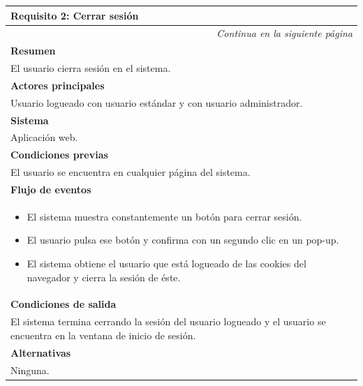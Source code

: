 \begin{longtable}{|p{}|}
\hline
\rowcolor[gray]{.5}
 \color{white}\textbf{Requisito 2: Cerrar sesión} \\
\hline
\endfirsthead
\endhead
\hline \multicolumn{1}{r}{\textit{Continua en la siguiente página}} \\
\endfoot
\endlastfoot
    \rowcolor[gray]{.9}
     \textbf{Resumen} \\
     \hline
     El usuario cierra sesión en el sistema. \\
     \hline
     \rowcolor[gray]{.9}
     \textbf{Actores principales} \\
     \hline
     Usuario logueado con usuario estándar y con usuario administrador. \\
     \hline
     \rowcolor[gray]{.9}
     \textbf{Sistema} \\
     \hline
     Aplicación web. \\
     \hline
     \rowcolor[gray]{.9}
     \textbf{Condiciones previas} \\
     \hline
      El usuario se encuentra en cualquier página del sistema.\\
     \hline
     \rowcolor[gray]{.9}
     \textbf{Flujo de eventos} \\
     \hline
      \begin{itemize}
         \item El sistema muestra constantemente un botón para cerrar sesión.
         \item El usuario pulsa ese botón y confirma con un segundo clic en un pop-up.
         \item El sistema obtiene el usuario que está logueado de las cookies del navegador y cierra la sesión de éste.
     \end{itemize} \\
     \hline
     \rowcolor[gray]{.9}
     \textbf{Condiciones de salida} \\
     \hline
     El sistema termina cerrando la sesión del usuario logueado y el usuario se encuentra en la ventana de inicio de sesión. \\
     \hline
     \rowcolor[gray]{.9}
     \textbf{Alternativas}  \\
     \hline
     Ninguna. \\
     \hline
\end{longtable}

